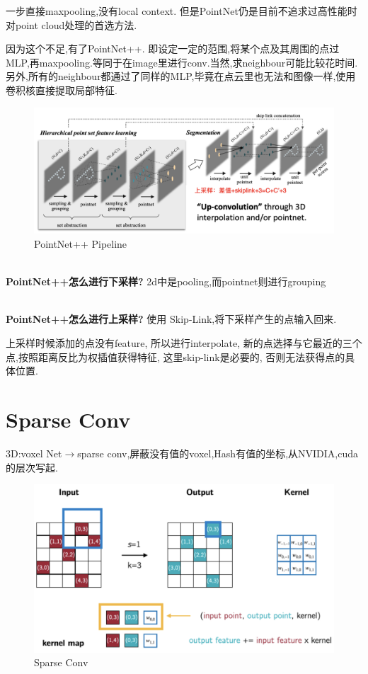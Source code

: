 一步直接maxpooling,没有local context.
但是PointNet仍是目前不追求过高性能时对point cloud处理的首选方法.

因为这个不足,有了PointNet++.
即设定一定的范围,将某个点及其周围的点过MLP,再maxpooling.等同于在image里进行conv.当然,求neighbour可能比较花时间.
另外,所有的neighbour都通过了同样的MLP,毕竟在点云里也无法和图像一样,使用卷积核直接提取局部特征.

\begin{figure}[htbp]
    \centering
    \includegraphics[scale=0.2]{figures/pointnet++.png}
    \caption{PointNet++ Pipeline}
\end{figure}

\textbf{\\PointNet++怎么进行下采样?} 2d中是pooling,而pointnet则进行grouping

\textbf{\\PointNet++怎么进行上采样?}
使用 Skip-Link,将下采样产生的点输入回来.

上采样时候添加的点没有feature, 所以进行interpolate,
新的点选择与它最近的三个点,按照距离反比为权插值获得特征, 这里skip-link是必要的, 否则无法获得点的具体位置.

\section{Sparse Conv}

3D:voxel Net$\rightarrow$sparse conv,屏蔽没有值的voxel,Hash有值的坐标,从NVIDIA,cuda的层次写起.

\begin{figure}[H]
    \centering
    \includegraphics[scale=0.2]{figures/sparsenet.png}
    \caption{Sparse Conv}
    \label{fig:sparsenet}
\end{figure}

